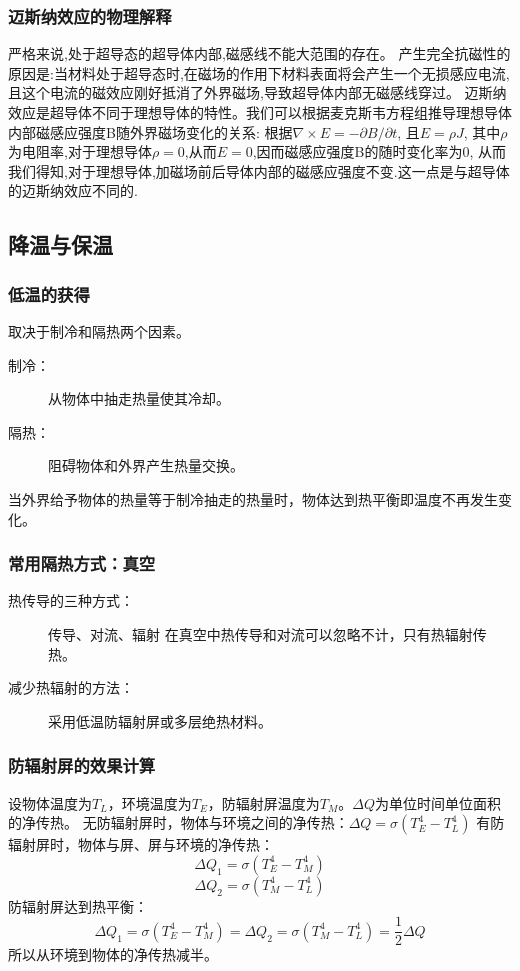 \documentclass{spaexp}
\begin{document}
            \subsubsection{迈斯纳效应的物理解释}
                严格来说,处于超导态的超导体内部,磁感线不能大范围的存在。
                产生完全抗磁性的原因是:当材料处于超导态时,在磁场的作用下材料表面将会产生一个无损感应电流,且这个电流的磁效应刚好抵消了外界磁场,导致超导体内部无磁感线穿过。
                迈斯纳效应是超导体不同于理想导体的特性。我们可以根据麦克斯韦方程组推导理想导体内部磁感应强度B随外界磁场变化的关系:
                根据$\nabla \times E = -\partial B / \partial t$, 且$E=\rho J$, 其中$\rho$为电阻率,对于理想导体$\rho=0$,从而$E=0$,因而磁感应强度B的随时变化率为0,
                从而我们得知,对于理想导体,加磁场前后导体内部的磁感应强度不变.这一点是与超导体的迈斯纳效应不同的.

        \subsection{降温与保温}
            \subsubsection{低温的获得}
                取决于制冷和隔热两个因素。
                \begin{description}
                    \item[制冷：]从物体中抽走热量使其冷却。
                    \item[隔热：]阻碍物体和外界产生热量交换。
                \end{description}
                当外界给予物体的热量等于制冷抽走的热量时，物体达到热平衡即温度不再发生变化。
                
            \subsubsection{常用隔热方式：真空}
                \begin{description}
                    \item[热传导的三种方式：]传导、对流、辐射
                    在真空中热传导和对流可以忽略不计，只有热辐射传热。
                    \item[减少热辐射的方法：]采用低温防辐射屏或多层绝热材料。
                \end{description}
            \subsubsection{防辐射屏的效果计算}
                设物体温度为$T_L$，环境温度为$T_E$，防辐射屏温度为$T_M$。$\Delta Q$为单位时间单位面积的净传热。
                无防辐射屏时，物体与环境之间的净传热：$\Delta Q = \sigma(T_E^4 - T_L^4)$
                有防辐射屏时，物体与屏、屏与环境的净传热：
                $$\Delta Q_1 = \sigma(T_E^4 - T_M^4)$$
                $$\Delta Q_2 = \sigma(T_M^4 - T_L^4)$$
                防辐射屏达到热平衡：
                $$\Delta Q_1 = \sigma(T_E^4 - T_M^4) = \Delta Q_2 = \sigma(T_M^4 - T_L^4) = \frac12 \Delta Q$$
                所以从环境到物体的净传热减半。
\end{document}
